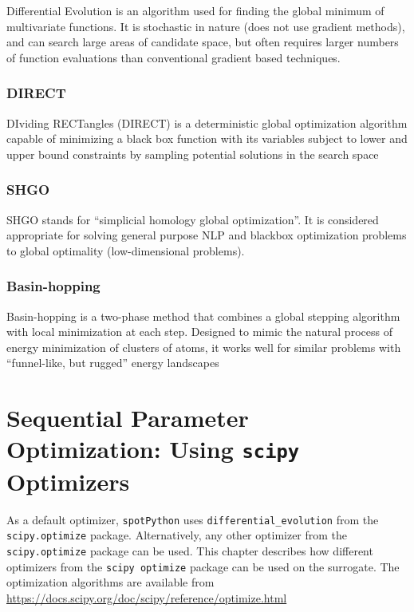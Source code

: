 \documentclass[
  letterpaper,
  DIV=11,
  numbers=noendperiod]{scrreprt}
\begin{document}
Differential Evolution is an algorithm used for finding the global
minimum of multivariate functions. It is stochastic in nature (does not
use gradient methods), and can search large areas of candidate space,
but often requires larger numbers of function evaluations than
conventional gradient based techniques.

\hypertarget{direct}{%
\subsection{DIRECT}\label{direct}}

DIviding RECTangles (DIRECT) is a deterministic global optimization
algorithm capable of minimizing a black box function with its variables
subject to lower and upper bound constraints by sampling potential
solutions in the search space

\hypertarget{shgo}{%
\subsection{SHGO}\label{shgo}}

SHGO stands for ``simplicial homology global optimization''. It is
considered appropriate for solving general purpose NLP and blackbox
optimization problems to global optimality (low-dimensional problems).

\hypertarget{basin-hopping}{%
\subsection{Basin-hopping}\label{basin-hopping}}

Basin-hopping is a two-phase method that combines a global stepping
algorithm with local minimization at each step. Designed to mimic the
natural process of energy minimization of clusters of atoms, it works
well for similar problems with ``funnel-like, but rugged'' energy
landscapes

\hypertarget{sec-scipy-optimizers}{%
\chapter{\texorpdfstring{Sequential Parameter Optimization: Using
\texttt{scipy}
Optimizers}{Sequential Parameter Optimization: Using scipy Optimizers}}\label{sec-scipy-optimizers}}

As a default optimizer, \texttt{spotPython} uses
\texttt{differential\_evolution} from the \texttt{scipy.optimize}
package. Alternatively, any other optimizer from the
\texttt{scipy.optimize} package can be used. This chapter describes how
different optimizers from the \texttt{scipy\ optimize} package can be
used on the surrogate. The optimization algorithms are available from
\url{https://docs.scipy.org/doc/scipy/reference/optimize.html}
\end{document}
